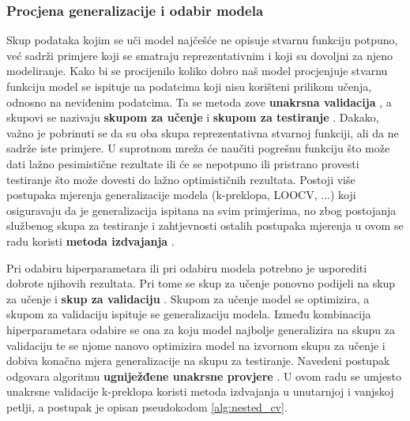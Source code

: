 \documentclass[times, utf8, numeric, diplomski]{fer}
\begin{document}
\subsubsection{Procjena generalizacije i odabir modela}
\label{sec:crossval}
Skup podataka kojim se uči model najčešće ne opisuje stvarnu funkciju potpuno, već sadrži primjere koji se smatraju reprezentativnim i koji su dovoljni za njeno modeliranje. Kako bi se procijenilo koliko dobro naš model procjenjuje stvarnu funkciju model se ispituje na podatcima koji nisu korišteni prilikom učenja, odnosno na neviđenim podatcima. Ta se metoda zove \textbf{unakrsna validacija} , a skupovi se nazivaju \textbf{skupom za učenje}  i \textbf{skupom za testiranje} . Dakako, važno je pobrinuti se da su oba skupa reprezentativna stvarnoj funkciji, ali da ne sadrže iste primjere. U suprotnom mreža će naučiti pogrešnu funkciju što može dati lažno pesimistične rezultate ili će se nepotpuno ili pristrano provesti testiranje što može dovesti do lažno optimističnih rezultata. Postoji više postupaka mjerenja generalizacije modela (k-preklopa, LOOCV, ...) koji osiguravaju da je generalizacija ispitana na svim primjerima, no zbog postojanja službenog skupa za testiranje i zahtjevnosti ostalih postupaka mjerenja u ovom se radu koristi \textbf{metoda izdvajanja} .

Pri odabiru hiperparametara ili pri odabiru modela potrebno je usporediti dobrote njihovih rezultata. Pri tome se skup za učenje ponovno podijeli na skup za učenje i \textbf{skup za validaciju} . Skupom za učenje model se optimizira, a skupom za validaciju ispituje se generalizaciju modela. Između kombinacija hiperparametara odabire se ona za koju model najbolje generalizira na skupu za validaciju te se njome nanovo optimizira model na izvornom skupu za učenje i dobiva konačna mjera generalizacije na skupu za testiranje. Navedeni postupak odgovara algoritmu \textbf{ugniježđene unakrsne provjere} . U ovom radu se umjesto unakrsne validacije k-preklopa koristi metoda izdvajanja u unutarnjoj i vanjskoj petlji, a postupak je opisan pseudokodom \ref{alg:nested_cv}.
\end{document}
